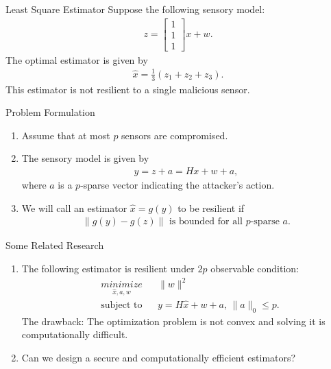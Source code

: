 \documentclass[10pt]{beamer}
\begin{document}
\begin{frame}{Least Square Estimator}
  Suppose the following sensory model:
  \begin{align*}
    z = \begin{bmatrix}
      1\\
      1\\
      1
    \end{bmatrix}x + w.
  \end{align*}
  The optimal estimator is given by
  \begin{align*}
    \hat x = \frac{1}{3}\left(z_1+z_2+z_3\right).
  \end{align*}
  This estimator is not resilient to a single malicious sensor.
\end{frame}

\begin{frame}{Problem Formulation}
  \begin{enumerate}
  \item Assume that at most $p$ sensors are compromised.
  \item The sensory model is given by
    \begin{align*}
      y = z + a = Hx + w +a,
    \end{align*}
    where $a$ is a $p$-sparse vector indicating the attacker's action.
  \item We will call an estimator $\hat x = g(y)$ to be resilient if
    \begin{align*}
      \|g(y) - g(z)\|\text{ is bounded for all $p$-sparse $a$}.
    \end{align*}
  \end{enumerate}
\end{frame}

\begin{frame}{Some Related Research}
  \begin{enumerate}
  \item The following estimator is resilient under $2p$ observable condition:
    \begin{align*}
      & \mathop{\textit{minimize}}\limits_{\hat x,a,w}&
      & \|w\|^2 \\
      &\text{subject to}&
      &y = H \hat x + w + a,\,\|a\|_0\leq p.
    \end{align*}
    The drawback: The optimization problem is not convex and solving it is computationally difficult.
  \item Can we design a secure and computationally efficient estimators?
  \end{enumerate}
\end{frame}
\end{document}
